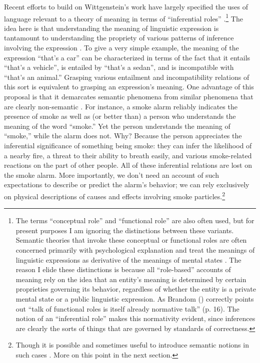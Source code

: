 Recent efforts to build on Wittgenstein's work have largely specified the uses of language relevant to a theory of meaning in terms of ``inferential roles'' \citep{Harman:1982,Brandom:2000,Brandom:1994,Block:1986}.\footnote{The terms ``conceptual role'' and ``functional role'' are also often used, but for present purposes I am ignoring the distinctions between these variants. Semantic theories that invoke these conceptual or functional roles are often concerned primarily with psychological explanation and treat the meanings of linguistic expressions as derivative of the meanings of mental states \citep[e.g.,][]{Harman:1982}. The reason I elide these distinctions is because all ``role-based'' accounts of meaning rely on the idea that an entity's meaning is determined by certain proprieties governing its behavior, regardless of whether the entity is a private mental state or a public linguistic expression. As Brandom (\citeyear{Brandom:1994}) correctly points out ``talk of functional roles is itself already normative talk'' (p. 16). The notion of an ``inferential role'' makes this normativity evident, since inferences are clearly the sorts of things that are governed by standards of correctness.} The idea here is that understanding the meaning of linguistic expression is tantamount to understanding the propriety of various patterns of inference involving the expression \citep{Brandom:1994}. To give a very simple example, the meaning of the expression ``that's a car'' can be characterized in terms of the fact that it entails ``that's a vehicle'', is entailed by ``that's a sedan'', and is incompatible with ``that's an animal.'' Grasping various entailment and incompatibility relations of this sort is equivalent to grasping an expression's meaning. One advantage of this proposal is that it demarcates semantic phenomena from similar phenomena that are clearly non-semantic \citep{Brandom:2000,Brandom:1994,Brandom:2009}. For instance, a smoke alarm reliably indicates the presence of smoke as well as (or better than) a person who understands the meaning of the word ``smoke.'' Yet the person understands the meaning of ``smoke,'' while the alarm does not. Why? Because the person appreciates the inferential significance of something being smoke: they can infer the likelihood of a nearby fire, a threat to their ability to breath easily, and various smoke-related reactions on the part of other people. All of these inferential relations are lost on the smoke alarm. More importantly, we don't need an account of such expectations to describe or predict the alarm's behavior; we can rely exclusively on physical descriptions of causes and effects involving smoke particles.\footnote{Though it is possible and sometimes useful to introduce semantic notions in such cases \citep{Dennett:1987,Hochstein:2011}. More on this point in the next section.}

